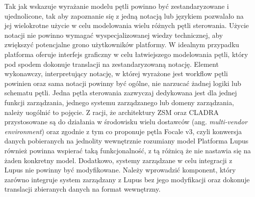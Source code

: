 Tak jak wskazuje \cite{fallon2019} wyrażanie modelu pętli powinno być zestandaryzowane i ujednolicone, tak aby zapoznanie się z jedną notacją lub językiem pozwalało na jej wielokrotne użycie w celu modelowania wielu różnych pętli sterowania. Użycie notacji nie powinno wymagać wyspecjalizowanej wiedzy technicznej, aby zwiększyć potencjalne grono użytkowników platformy. W idealnym przypadku platforma oferuje interfejs graficzny w celu łatwiejszego modelowania pętli, który pod spodem dokonuje translacji na zestandaryzowaną notację. Element wykonawczy, interpretujący notację, w której wyrażone jest workflow pętli powinien oraz sama notacji powinny być ogólne, nie narzucać żadnej logiki lub schematu pętli. Jedna pętla sterowania zazwyczaj dedykowana jest dla jednej funkcji zarządzania, jednego systemu zarządzanego lub domeny zarządzania, należy uogólnić to pojęcie. Z racji, że architektury ZSM oraz CLADRA przystosowane są do działania w środowisku wielu dostawców (ang. \textit{multi-vendor environment}) oraz zgodnie z tym co proponuje pętla Focale v3, czyli konwersja danych pobieranych na jednolity wewnętrznie rozumiany model Platforma Lupus również powinna wspierać taką funkcjonalność, z tą różnicą że nie nastawia się na żaden konkretny model. Dodatkowo, systemy zarządzane w celu integracji z Lupus nie powinny być modyfikowane. Należy wprowadzić komponent, który zarówno integruje system zarządzany z Lupus bez jego modyfikacji oraz dokonuje translacji zbieranych danych na format wewnętrzny.

